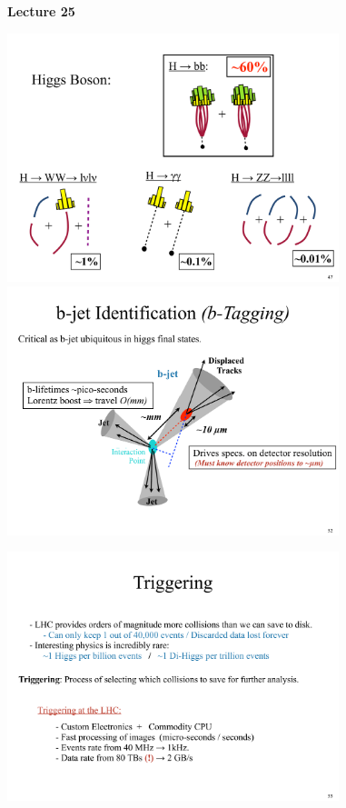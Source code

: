 



\thispagestyle{fancy}

\begin{center}
{\huge \textbf{Lecture 25}}
\end{center}

{\fontsize{14}{16}\selectfont

\bc
\includegraphics[width=0.725\textwidth]{./HiggsBosonDecays.pdf}
\ec
\lineacross
\bc
\includegraphics[width=0.725\textwidth]{./BTagging.pdf}
\ec

\clearpage

\bc
\includegraphics[width=0.725\textwidth]{./Triggering.pdf}
\ec
\lineacross

}
